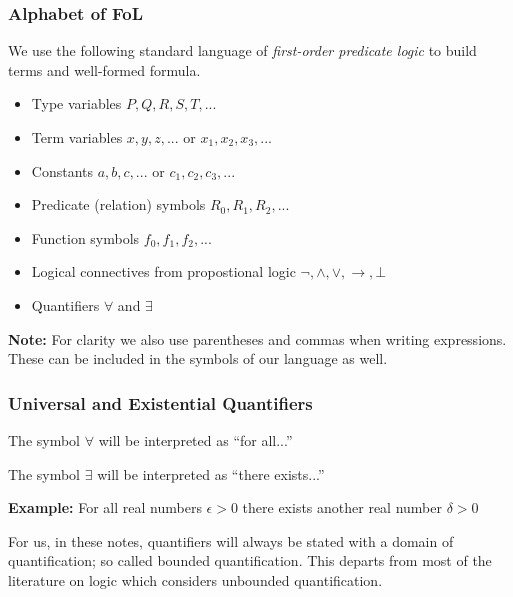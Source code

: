 \documentclass{beamer}
\theoremstyle{indentDefn} \newtheorem{defn}[]{Definition}
\begin{document}
\begin{frame}
	\frametitle{Alphabet of FoL}
	
	We use the following standard language of \emph{first-order predicate logic} to build terms and well-formed formula.
	
	\begin{itemize}
		\item Type variables $P, Q, R, S, T, ...$
		\item Term variables $x,y,z,...$ or $x_{1}, x_{2}, x_{3},...$
		\item Constants $a,b,c, ...$ or $c_{1}, c_{2}, c_{3}, ...$
		\item Predicate (relation) symbols $R_{0}, R_{1}, R_{2}, ... $
		\item Function symbols $f_{0}, f_{1}, f_{2}, ... $
		\item Logical connectives from propostional logic $\lnot, \land, \lor, \rightarrow, \bot$
		\item Quantifiers $\forall$ and $\exists$
	\end{itemize}
	
	{\bf Note:} For clarity we also use parentheses and commas when writing expressions. These can be included in the symbols of our language as well.
	
	
\end{frame}

\begin{frame}
	\frametitle{Universal and Existential Quantifiers}
	
	The symbol $\forall$ will be interpreted as ``for all...''
	
	The symbol $\exists$ will be interpreted as ``there exists...''
	
	\vspace{0.5cm}
	
	{\bf Example:}
	For all real numbers $\epsilon >0$ there exists another real number $\delta > 0$
	
	\vspace{2cm}
	
	For us, in these notes, quantifiers will always be stated with a domain of quantification; so called bounded quantification. This departs from most of the literature on logic which considers unbounded quantification. 
	
\end{frame}
\end{document}
